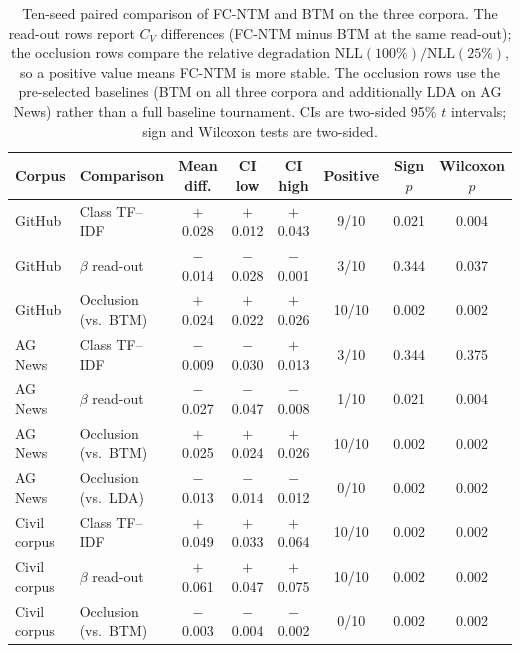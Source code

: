 \documentclass[11pt]{article}
\newcommand{\fcntm}{FC-NTM}
\begin{document}
\begin{table}[t]
\centering
\caption{Ten-seed paired comparison of \fcntm{} and BTM on the three corpora. The read-out rows report $C_V$ differences (\fcntm{} minus BTM at the same read-out); the occlusion rows compare the relative degradation $\mathrm{NLL}(100\%)/\mathrm{NLL}(25\%)$, so a positive value means \fcntm{} is more stable. The occlusion rows use the pre-selected baselines (BTM on all three corpora and additionally LDA on AG News) rather than a full baseline tournament. CIs are two-sided 95\% $t$ intervals; sign and Wilcoxon tests are two-sided.}
\label{tab:seed-paired}
\footnotesize
\setlength{\tabcolsep}{3pt}
\begin{tabular}{@{}llcccccc@{}}
\toprule
Corpus & Comparison & Mean diff. & CI low & CI high & Positive & Sign $p$ & Wilcoxon $p$ \\
\midrule
GitHub & Class TF--IDF & $+$0.028 & $+$0.012 & $+$0.043 & 9/10 & 0.021 & 0.004 \\
GitHub & $\beta$ read-out & $-$0.014 & $-$0.028 & $-$0.001 & 3/10 & 0.344 & 0.037 \\
GitHub & Occlusion (vs.\ BTM) & $+$0.024 & $+$0.022 & $+$0.026 & 10/10 & 0.002 & 0.002 \\
\midrule
AG News & Class TF--IDF & $-$0.009 & $-$0.030 & $+$0.013 & 3/10 & 0.344 & 0.375 \\
AG News & $\beta$ read-out & $-$0.027 & $-$0.047 & $-$0.008 & 1/10 & 0.021 & 0.004 \\
AG News & Occlusion (vs.\ BTM) & $+$0.025 & $+$0.024 & $+$0.026 & 10/10 & 0.002 & 0.002 \\
AG News & Occlusion (vs.\ LDA) & $-$0.013 & $-$0.014 & $-$0.012 & 0/10 & 0.002 & 0.002 \\
\midrule
Civil corpus & Class TF--IDF & $+$0.049 & $+$0.033 & $+$0.064 & 10/10 & 0.002 & 0.002 \\
Civil corpus & $\beta$ read-out & $+$0.061 & $+$0.047 & $+$0.075 & 10/10 & 0.002 & 0.002 \\
Civil corpus & Occlusion (vs.\ BTM) & $-$0.003 & $-$0.004 & $-$0.002 & 0/10 & 0.002 & 0.002 \\
\bottomrule
\end{tabular}
\end{table}
\end{document}
